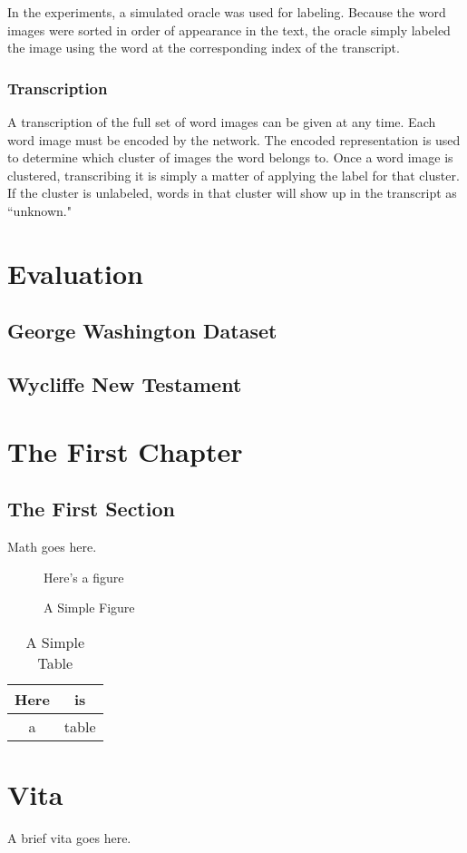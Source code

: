 \documentclass[final]{ukthesis}
\begin{document}
In the experiments, a simulated oracle was used for labeling. Because the word images were sorted in order of appearance in the text, the oracle simply labeled the image using the word at the corresponding index of the transcript.


\subsection{Transcription}
A transcription of the full set of word images can be given at any time. Each word image must be encoded by the network. The encoded representation is used to determine which cluster of images the word belongs to. Once a word image is clustered, transcribing it is simply a matter of applying the label for that cluster. If the cluster is unlabeled, words in that cluster will show up in the transcript as ``unknown." 


%
%
%
\chapter{Evaluation}
\section{George Washington Dataset}

\section{Wycliffe New Testament}



\chapter{The First Chapter}
\section{The First Section}
Math goes here.
\begin{figure}[h]
\centering
Here's a figure
\caption{A Simple Figure}
\end{figure}
\begin{table}[h]
\centering
\begin{tabular}{c|c}
Here & is \\
\hline
a & table
\end{tabular}
\caption{A Simple Table}
\end{table}
\copyrightnotice
\backmatter

\chapter{Vita}
A brief vita goes here.
\end{document}
